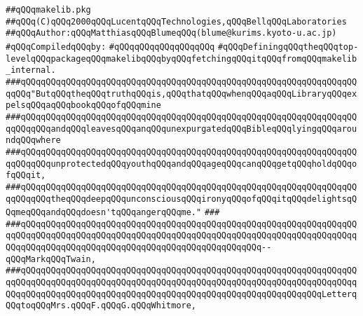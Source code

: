 \label{src/lib/core/makelib/makelib.pkg}
\verb|##qQQqmakelib.pkg|\newline
\verb|##qQQq(C)qQQq2000qQQqLucentqQQqTechnologies,qQQqBellqQQqLaboratories|\newline
\verb|##qQQqAuthor:qQQqMatthiasqQQqBlumeqQQq(blume@kurims.kyoto-u.ac.jp)|\newline
\newline
\verb|#qQQqCompiledqQQqby:|\newline
\verb|#qQQqqQQqqQQqqQQqqQQq|\newline
\newline
\newline
\newline
\verb|#qQQqDefiningqQQqtheqQQqtop-levelqQQqpackageqQQqmakelibqQQqbyqQQqfetchingqQQqitqQQqfromqQQqmakelib_internal.|\newline
\newline
\newline
\newline
\newline
\verb|###qQQqqQQqqQQqqQQqqQQqqQQqqQQqqQQqqQQqqQQqqQQqqQQqqQQqqQQqqQQqqQQqqQQqqQQq"ButqQQqtheqQQqtruthqQQqis,qQQqthatqQQqwhenqQQqaqQQqLibraryqQQqexpelsqQQqaqQQqbookqQQqofqQQqmine|\newline
\verb|###qQQqqQQqqQQqqQQqqQQqqQQqqQQqqQQqqQQqqQQqqQQqqQQqqQQqqQQqqQQqqQQqqQQqqQQqqQQqandqQQqleavesqQQqanqQQqunexpurgatedqQQqBibleqQQqlyingqQQqaroundqQQqwhere|\newline
\verb|###qQQqqQQqqQQqqQQqqQQqqQQqqQQqqQQqqQQqqQQqqQQqqQQqqQQqqQQqqQQqqQQqqQQqqQQqqQQqunprotectedqQQqyouthqQQqandqQQqageqQQqcanqQQqgetqQQqholdqQQqofqQQqit,|\newline
\verb|###qQQqqQQqqQQqqQQqqQQqqQQqqQQqqQQqqQQqqQQqqQQqqQQqqQQqqQQqqQQqqQQqqQQqqQQqqQQqtheqQQqdeepqQQqunconsciousqQQqironyqQQqofqQQqitqQQqdelightsqQQqmeqQQqandqQQqdoesn'tqQQqangerqQQqme."|\newline
\verb|###|\newline
\verb|###qQQqqQQqqQQqqQQqqQQqqQQqqQQqqQQqqQQqqQQqqQQqqQQqqQQqqQQqqQQqqQQqqQQqqQQqqQQqqQQqqQQqqQQqqQQqqQQqqQQqqQQqqQQqqQQqqQQqqQQqqQQqqQQqqQQqqQQqqQQqqQQqqQQqqQQqqQQqqQQqqQQqqQQqqQQqqQQqqQQqqQQqqQQq--qQQqMarkqQQqTwain,|\newline
\verb|###qQQqqQQqqQQqqQQqqQQqqQQqqQQqqQQqqQQqqQQqqQQqqQQqqQQqqQQqqQQqqQQqqQQqqQQqqQQqqQQqqQQqqQQqqQQqqQQqqQQqqQQqqQQqqQQqqQQqqQQqqQQqqQQqqQQqqQQqqQQqqQQqqQQqqQQqqQQqqQQqqQQqqQQqqQQqqQQqqQQqqQQqqQQqqQQqqQQqqQQqLetterqQQqtoqQQqMrs.qQQqF.qQQqG.qQQqWhitmore,|\newline
